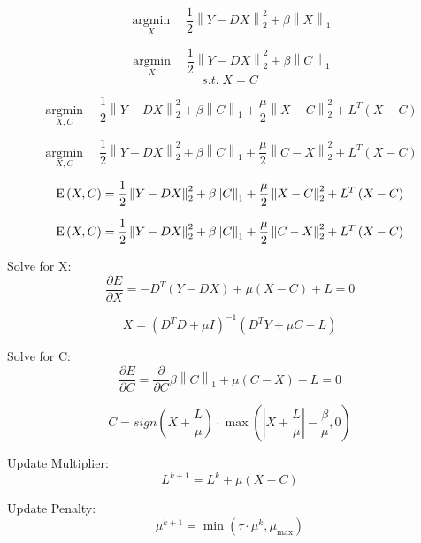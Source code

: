 \documentclass[10pt,a4paper]{article}
\begin{document}
	
	\[\mathop {\arg \min }\limits_X \quad \frac{1}{2}\left\| {Y - DX} \right\|_2^2 + \beta {\left\| X \right\|_1}\]
	
	\[\mathop {\arg \min }\limits_X \quad \frac{1}{2}\left\| {Y - DX} \right\|_2^2 + \beta {\left\| C \right\|_1}\]
	\[s.t.\;X = C\]
	
	\[\mathop {\arg \min }\limits_{X,C} \quad \frac{1}{2}\left\| {Y - DX} \right\|_2^2 + \beta {\left\| C \right\|_1} + \frac{\mu }{2}\left\| {X - C} \right\|_2^2 + {L^T}\left( {X - C} \right)\]
	
	\[\mathop {\arg \min }\limits_{X,C} \quad \frac{1}{2}\left\| {Y - DX} \right\|_2^2 + \beta {\left\| C \right\|_1} + \frac{\mu }{2}\left\| {C - X} \right\|_2^2 + {L^T}\left( {X - C} \right)\]
	
	\[{\rm E}\left( {X,C} \right) = \frac{1}{2}\left\| {Y - DX} \right\|_2^2 + \beta {\left\| C \right\|_1} + \frac{\mu }{2}\left\| {X - C} \right\|_2^2 + {L^T}\left( {X - C} \right)\]
	
	\[{\rm E}\left( {X,C} \right) = \frac{1}{2}\left\| {Y - DX} \right\|_2^2 + \beta {\left\| C \right\|_1} + \frac{\mu }{2}\left\| {C - X} \right\|_2^2 + {L^T}\left( {X - C} \right)\]
	
Solve for X:
		\[\frac{{\partial E}}{{\partial X}} =  - {D^T}\left( {Y - DX} \right) + \mu \left( {X - C} \right) + L = 0\]
		
		\[X = {\left( {{D^T}D + \mu I} \right)^{ - 1}}\left( {{D^T}Y + \mu C - L} \right)\]
	
Solve for C:
	\[\frac{{\partial E}}{{\partial C}} = \frac{\partial }{{\partial C}}\beta {\left\| C \right\|_1} + \mu \left( {C - X} \right) - L = 0\]
	
	\[C = sign\left( {X + \frac{L}{\mu }} \right) \cdot \max \left( {\left| {X + \frac{L}{\mu }} \right| - \frac{\beta }{\mu },0} \right)\]
	
Update Multiplier:
	\[{L^{k + 1}} = {L^k} + \mu \left( {X - C} \right)\]

Update Penalty:
	\[{\mu ^{k + 1}} = \min \left( {\tau  \cdot {\mu ^k},{\mu _{\max }}} \right)\]
	
\end{document}
